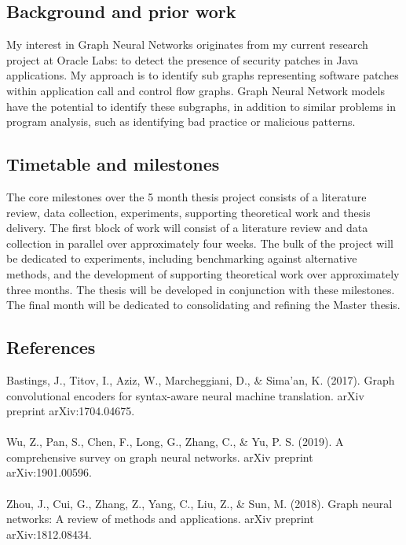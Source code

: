 \subsection*{Background and prior work}
My interest in Graph Neural Networks originates from my current research project at Oracle Labs: to detect the presence of security patches in Java applications. My approach is to identify sub graphs representing software patches within application call and control flow graphs. Graph Neural Network models have the potential to identify these subgraphs, in addition to similar problems in program analysis, such as identifying bad practice or malicious patterns. 

\subsection*{Timetable and milestones}
The core milestones over the 5 month thesis project consists of a literature review, data collection, experiments, supporting theoretical work and thesis delivery. The first block of work will consist of a literature review and data collection in parallel over approximately four weeks. The bulk of the project will be dedicated to experiments, including benchmarking against alternative methods, and the development of supporting theoretical work over approximately three months. The thesis will be developed in conjunction with these milestones. The final month will be dedicated to consolidating and refining the Master thesis.

\subsection*{References}

Bastings, J., Titov, I., Aziz, W., Marcheggiani, D., \& Sima'an, K. (2017). Graph convolutional encoders for syntax-aware neural machine translation. arXiv preprint arXiv:1704.04675.
\\
\\
Wu, Z., Pan, S., Chen, F., Long, G., Zhang, C., \& Yu, P. S. (2019). A comprehensive survey on graph neural networks. arXiv preprint arXiv:1901.00596.
\\
\\
Zhou, J., Cui, G., Zhang, Z., Yang, C., Liu, Z., \& Sun, M. (2018). Graph neural networks: A review of methods and applications. arXiv preprint arXiv:1812.08434.


